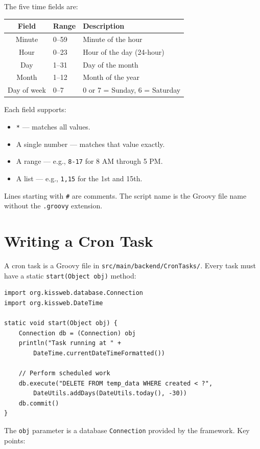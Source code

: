 \noindent
The five time fields are:

\begin{longtable}{clP{6.5cm}}
\toprule
\textbf{Field} & \textbf{Range} & \textbf{Description} \\
\midrule
\endhead
Minute & 0--59 & Minute of the hour \\
Hour & 0--23 & Hour of the day (24-hour) \\
Day & 1--31 & Day of the month \\
Month & 1--12 & Month of the year \\
Day of week & 0--7 & 0 or 7 = Sunday, 6 = Saturday \\
\bottomrule
\end{longtable}

\noindent
Each field supports:
\begin{itemize}
  \item \texttt{*} --- matches all values.
  \item A single number --- matches that value exactly.
  \item A range --- e.g., \texttt{8-17} for 8 AM through 5 PM.
  \item A list --- e.g., \texttt{1,15} for the 1st and 15th.
\end{itemize}

\noindent
Lines starting with \texttt{\#} are comments.  The script name is the Groovy file name without the \texttt{.groovy} extension.

\section{Writing a Cron Task}
\label{sec:cron-writing}

A cron task is a Groovy file in \texttt{src/main/backend/CronTasks/}.  Every task must have a static \texttt{start(Object obj)} method:

\begin{lstlisting}[style=groovy]
import org.kissweb.database.Connection
import org.kissweb.DateTime

static void start(Object obj) {
    Connection db = (Connection) obj
    println("Task running at " +
        DateTime.currentDateTimeFormatted())

    // Perform scheduled work
    db.execute("DELETE FROM temp_data WHERE created < ?",
        DateUtils.addDays(DateUtils.today(), -30))
    db.commit()
}
\end{lstlisting}

\noindent
The \texttt{obj} parameter is a database \texttt{Connection} provided by the framework.  Key points:

